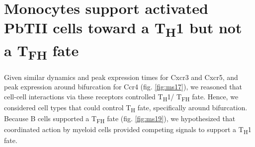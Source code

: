 \section{Monocytes support activated PbTII cells toward a \texorpdfstring{T\textsubscript{H}1 but not a T\textsubscript{FH}}{TH1 but not a TFH} fate}

Given similar dynamics and peak expression times for Cxcr3 and Cxcr5, and peak expression around bifurcation for Ccr4 (fig. \ref{fig:ms17}), we reasoned that cell-cell interactions via these receptors controlled T\textsubscript{H}1/ T\textsubscript{FH} fate. Hence, we considered cell types that could control T\textsubscript{H} fate, specifically around bifurcation. Because B cells supported a T\textsubscript{FH} fate (fig. \ref{fig:ms19}), we hypothesized that coordinated action by myeloid cells provided competing signals to support a T\textsubscript{H}1 fate.


